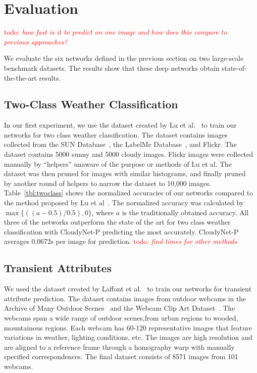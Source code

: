 \documentclass{article}
\newcommand{\todo}[1]{\textcolor{red}{todo: {\em #1}}}
\newcommand{\tblref}[1]{Table~\ref{tbl:#1}}
\begin{document}
\section{Evaluation}

\todo{how fast is it to predict on one image and how does this compare
to previous approaches?}

We evaluate the six networks defined in the previous section on two
large-scale benchmark datasets. The results show that these deep
networks obtain state-of-the-the-art results. 

\subsection{Two-Class Weather Classification}

In our first experiment, we use the dataset created by Lu et al.~\cite{lutwoclass} to train
our networks for two class weather classification.  The dataset
contains images collected from the SUN Database~\cite{xiaoSUN}, the
LabelMe Database~\cite{russell2008labelme}, and Flickr. The dataset
contains 5000 sunny and 5000 cloudy images. Flickr images were
collected manually by ``helpers'' unaware of the purpose or methods of
Lu et al. The dataset was then pruned for images with similar
histograms, and finally pruned by another round of helpers to narrow
the dataset to 10,000 images.  \tblref{twoclass} shows the normalized
accuracies of our networks compared to the method proposed by
Lu et al~\cite{lutwoclass}.  The normalized accuracy was calculated by
$ \max\{((a - 0.5) / 0.5), 0\} $, where $a$ is the traditionally
obtained accuracy. All three of the networks outperform the state of
the art for two class weather classification with CloudyNet-P
predicting the most accurately.  CloudyNet-P averages 0.0672s per
image for prediction. \todo{find times for other methods}

\subsection{Transient Attributes}

We used the dataset created by Laffont et al.~\cite{Laffont14} to
train our networks for transient attribute prediction. The dataset
contains images from outdoor webcams in the Archive of Many Outdoor
Scenes~\cite{jacobs07amos} and the Webcam Clip Art
Dataset~\cite{lalondesig09}.  The webcams span a wide range of outdoor
scenes,from urban regions to wooded, mountainous regions. Each webcam
has 60-120 representative images that feature variations in weather,
lighting conditions, etc.  The images are high resolution and are
aligned to a reference frame through a homography warp with manually
specified correspondences.  The final dataset consists of 8571 images
from 101 webcams.
\end{document}
